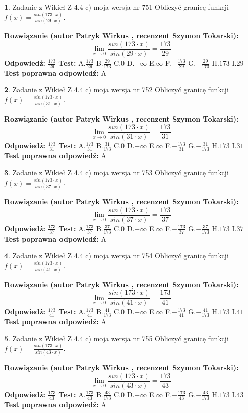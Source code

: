 \documentclass[12pt, a4paper]{article}
\theoremstyle{definition} %
\newtheorem{zad}{}
\newcommand{\zadStart}[1]{\begin{zad}#1\newline}
\newcommand{\zadStop}{\end{zad}}
\newcommand{\rozwStart}[2]{\noindent \textbf{Rozwiązanie (autor #1 , recenzent #2): }\newline}
\newcommand{\rozwStop}{\newline}
\newcommand{\odpStart}{\noindent \textbf{Odpowiedź:}\newline}
\newcommand{\odpStop}{\newline}
\newcommand{\testStart}{\noindent \textbf{Test:}\newline}
\newcommand{\testStop}{\newline}
\newcommand{\kluczStart}{\noindent \textbf{Test poprawna odpowiedź:}\newline}
\newcommand{\kluczStop}{\newline}
\begin{document}
\zadStart{Zadanie z Wikieł Z 4.4 c) moja wersja nr 751}
Obliczyć granicę funkcji $f(x)=\frac{sin(173\cdot x)}{sin(29\cdot x)}$.
\zadStop
\rozwStart{Patryk Wirkus}{Szymon Tokarski}
$$\lim\limits_{x\to 0}\frac{sin(173\cdot x)}{sin(29\cdot x)}=
\frac{173}{29}$$
\rozwStop
\odpStart
$\frac{173}{29}$
\odpStop
\testStart
A.$\frac{173}{29}$
B.$\frac{29}{173}$
C.$0$
D.$-\infty$
E.$\infty$
F.$-\frac{173}{29}$
G.$-\frac{29}{173}$
H.$173$
I.$29$
\testStop
\kluczStart
A
\kluczStop



\zadStart{Zadanie z Wikieł Z 4.4 c) moja wersja nr 752}
Obliczyć granicę funkcji $f(x)=\frac{sin(173\cdot x)}{sin(31\cdot x)}$.
\zadStop
\rozwStart{Patryk Wirkus}{Szymon Tokarski}
$$\lim\limits_{x\to 0}\frac{sin(173\cdot x)}{sin(31\cdot x)}=
\frac{173}{31}$$
\rozwStop
\odpStart
$\frac{173}{31}$
\odpStop
\testStart
A.$\frac{173}{31}$
B.$\frac{31}{173}$
C.$0$
D.$-\infty$
E.$\infty$
F.$-\frac{173}{31}$
G.$-\frac{31}{173}$
H.$173$
I.$31$
\testStop
\kluczStart
A
\kluczStop



\zadStart{Zadanie z Wikieł Z 4.4 c) moja wersja nr 753}
Obliczyć granicę funkcji $f(x)=\frac{sin(173\cdot x)}{sin(37\cdot x)}$.
\zadStop
\rozwStart{Patryk Wirkus}{Szymon Tokarski}
$$\lim\limits_{x\to 0}\frac{sin(173\cdot x)}{sin(37\cdot x)}=
\frac{173}{37}$$
\rozwStop
\odpStart
$\frac{173}{37}$
\odpStop
\testStart
A.$\frac{173}{37}$
B.$\frac{37}{173}$
C.$0$
D.$-\infty$
E.$\infty$
F.$-\frac{173}{37}$
G.$-\frac{37}{173}$
H.$173$
I.$37$
\testStop
\kluczStart
A
\kluczStop



\zadStart{Zadanie z Wikieł Z 4.4 c) moja wersja nr 754}
Obliczyć granicę funkcji $f(x)=\frac{sin(173\cdot x)}{sin(41\cdot x)}$.
\zadStop
\rozwStart{Patryk Wirkus}{Szymon Tokarski}
$$\lim\limits_{x\to 0}\frac{sin(173\cdot x)}{sin(41\cdot x)}=
\frac{173}{41}$$
\rozwStop
\odpStart
$\frac{173}{41}$
\odpStop
\testStart
A.$\frac{173}{41}$
B.$\frac{41}{173}$
C.$0$
D.$-\infty$
E.$\infty$
F.$-\frac{173}{41}$
G.$-\frac{41}{173}$
H.$173$
I.$41$
\testStop
\kluczStart
A
\kluczStop



\zadStart{Zadanie z Wikieł Z 4.4 c) moja wersja nr 755}
Obliczyć granicę funkcji $f(x)=\frac{sin(173\cdot x)}{sin(43\cdot x)}$.
\zadStop
\rozwStart{Patryk Wirkus}{Szymon Tokarski}
$$\lim\limits_{x\to 0}\frac{sin(173\cdot x)}{sin(43\cdot x)}=
\frac{173}{43}$$
\rozwStop
\odpStart
$\frac{173}{43}$
\odpStop
\testStart
A.$\frac{173}{43}$
B.$\frac{43}{173}$
C.$0$
D.$-\infty$
E.$\infty$
F.$-\frac{173}{43}$
G.$-\frac{43}{173}$
H.$173$
I.$43$
\testStop
\kluczStart
A
\kluczStop
\end{document}
